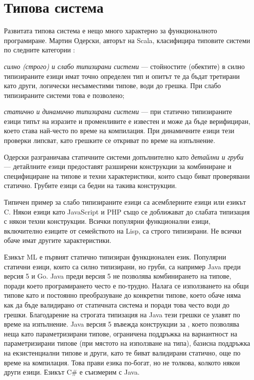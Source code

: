 \section{Типова система}

Развитата типова система е нещо много характерно за функционалното програмиране. Мартин Одерски, авторът на Scala, класифицира типовите системи по следните категории \cite{odersky2013Types}:

\begin{itemize*}
  \item \emph{силно (строго) и слабо типизирани системи} — стойностите (обектите) в силно типизираните езици имат точно определен тип и опитът те да бъдат третирани като други, логически несъвместими типове, води до грешка. При слабо типизираните системи това е позволено;
  \item \emph{статично и динамично типизирани системи} — при статично типизираните езици типът на изразите и променливите е известен и може да бъде верифициран, което става най-често по време на компилация. При динамичните езици тези проверки липсват, като грешките се откриват по време на изпълнение.
  \item Одерски разграничава статичните системи допълнително като \emph{детайлни и груби} — детайлните езици предоставят разширени конструкции за комбиниране и специфициране на типове и техни характеристики, които също биват проверявани статично. Грубите езици са бедни на такива конструкции.
\end{itemize*}

Типичен пример за слабо типизираните езици са асемблерните езици или езикът C. Някои езици като JavaScript и PHP също се доближават до слабата типизация с някои техни конструкции. Всички популярни функционални езици, включително езиците от семейството на Lisp, са строго типизирани. Не всички обаче имат другите характеристики.

Езикът ML е първият статично типизиран функционален език. Популярни статични езици, които са силно типизирани, но груби, са например Java преди версия 5 и Go. Java преди версия 5 не позволява комбинирането на типове, поради което програмирането често е по-трудно. Налага се използването на общи типове като  и постоянно преобразуване до конкретни типове, което обаче няма как да бъде валидирано от статичната система и поради това често води до грешки. Благодарение на строгата типизация на Java тези грешки се улавят по време на изпълнение. Java версия 5 въвежда конструкции за , което позволява неща като параметризирани типове, ограничена поддръжка на вариантност на параметризирани типове (при мястото на използване на типа), базисна поддръжка на екзистенциални типове и други, като те биват валидирани статично, още по време на компилация. Това прави езика по-богат, но не толкова, колкото някои други езици. Езикът C\# е съизмерим с Java.

